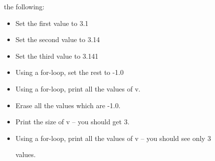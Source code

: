 the following:



\begin{itemize}

\item

  Set the first value to 3.1

\item

  Set the second value to 3.14

\item

  Set the third value to 3.141

\item

  Using a for-loop, set the rest to -1.0

\item

  Using a for-loop, print all the values of v.

\item

  Erase all the values which are -1.0.

\item

  Print the size of v -- you should get 3.

\item

  Using a for-loop, print all the values of v -- you should see only 3

  values.

\end{itemize}

